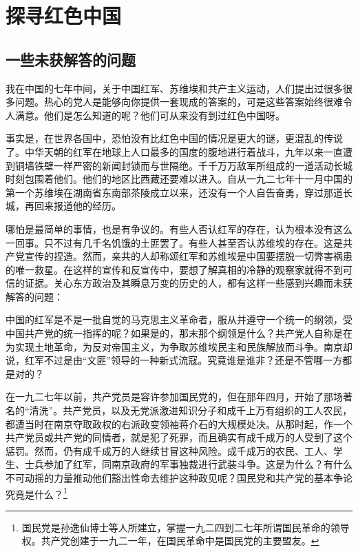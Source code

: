 \documentclass[10pt]{book}
\begin{document}
\newpage

\setcounter{page}{1}

\chapter{探寻红色中国}

\section{一些未获解答的问题}

我在中国的七年中间，关于中国红军、苏维埃和共产主义运动，人们提出过很多很多问题。热心的党人是能够向你提供一套现成的答案的，可是这些答案始终很难令人满意。他们是怎么知道的呢？他们可从来没有到过红色中国呀。

事实是，在世界各国中，恐怕没有比红色中国的情况是更大的谜，更混乱的传说了。中华天朝的红军在地球上人口最多的国度的腹地进行着战斗，九年以来一直遭到铜墙铁壁一样严密的新闻封锁而与世隔绝。千千万万敌军所组成的一道活动长城时刻包围着他们。他们的地区比西藏还要难以进入。自从一九二七年十一月中国的第一个苏维埃在湖南省东南部茶陵成立以来，还没有一个人自告奋勇，穿过那道长城，再回来报道他的经历。

哪怕是最简单的事情，也是有争议的。有些人否认红军的存在，认为根本没有这么一回事。只不过有几千名饥饿的土匪罢了。有些人甚至否认苏维埃的存在。这是共产党宣传的捏造。然而，亲共的人却称颂红军和苏维埃是中国要摆脱一切弊害祸患的唯一救星。在这样的宣传和反宣传中，要想了解真相的冷静的观察家就得不到可信的证据。关心东方政治及其瞬息万变的历史的人，都有这样一些感到兴趣而未获解答的问题：

中国的红军是不是一批自觉的马克思主义革命者，服从并遵守一个统一的纲领，受中国共产党的统一指挥的呢？如果是的，那末那个纲领是什么？共产党人自称是在为实现土地革命，为反对帝国主义，为争取苏维埃民主和民族解放而斗争。南京却说，红军不过是由“文匪”领导的一种新式流寇。究竟谁是谁非？还是不管哪一方都是对的？

在一九二七年以前，共产党员是容许参加国民党的，但在那年四月，开始了那场著名的“清洗”。共产党员，以及无党派激进知识分子和成千上万有组织的工人农民，都遭当时在南京夺取政权的右派政变领袖蒋介石的大规模处决。从那时起，作一个共产党员或共产党的同情者，就是犯了死罪，而且确实有成千成万的人受到了这个惩罚。然而，仍有成千成万的人继续甘冒这种风险。成千成万的农民、工人、学生、士兵参加了红军，同南京政府的军事独裁进行武装斗争。这是为什么？有什么不可动摇的力量推动他们豁出性命去维护这种政见呢？国民党和共产党的基本争论究竟是什么？\footnote{国民党是孙逸仙博士等人所建立，掌握一九二四到二七年所谓国民革命的领导权。共产党创建于一九二一年，在国民革命中是国民党的主要盟友。}
\end{document}
